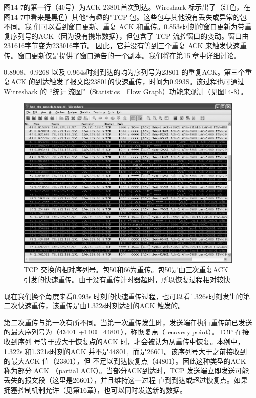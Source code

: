 图14-7的第一行（40号）为ACK 23801首次到达。Wireshark 标示出了（红色，在图14-7中看来是黑色）其他“有趣的”TCP 包。这些包与其他没有丢失或异常的包不同。我
们可以看到窗口更新、重复 ACK 和重传。0.853s时刻的窗口更新为带重复序列号的ACK（因为没有携带数据），但包含了 TCP 流控窗口的变动。窗口由231616字节变为233016字节。
因此，它并没有等到三个重复 ACK 来触发快速重传。窗口更新仅是提供了窗口通告的一个副本。我们将在第15 章中详细讨论。

0.8908、0.9268 以及 0.964s时刻到达的均为序列号为23801 的重复ACK。第三个重复ACK 的到达触发了报文段23801的快速重传，时间为0.993S。该过程也可通过 Witreshark 的
“统计|流图”（Statistics | Flow Graph）功能来观测（见图14-8）。

\begin{figure}[!htb]
	\includegraphics[width=1.0\textwidth]{imgs/14/14-7.png}
	\caption{TCP 交换的相对序列号。包50和66为重传。包50是由三次重复ACK 引发的快速重传。由于没有重传计时器超时，所以恢复过程相对较快}
\end{figure}

现在我们换个角度来看0.993s 时刻的快速重传过程，也可以看1.326s时刻发生的第二次快速重传，该重传是由1.322s时刻达到的ACK 触发的。

第二次重传与第一次有所不同。当第一次重传发生时，发送端在执行重传前已发送的最大序列号为（43401 +1400=44801），称恢复点（recovery point）。TCP 在接收到序列
号等于或大于恢复点的ACK 时，才会被认为从重传中恢复。本例中，1.322s 和1.321s时刻的ACK 并不是44801，而是26601。该序列号大于之前接收到的最大ACK 值（23801），但
不足以到达恢复点（44801）。因此这种类型的ACK 称为部分 ACK （partial ACK）。当部分ACK到达时，TCP 发送端立即发送可能丢失的报文段（这里是26601），并且维持这一过程
直到到达或超过恢复点。如果拥塞控制机制允许（见第16章），也可以同时发送新的数据。

